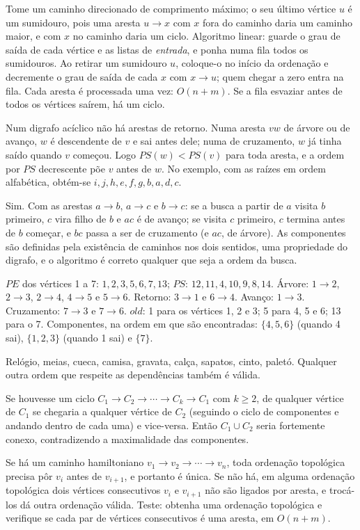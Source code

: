  Tome um caminho direcionado de comprimento máximo; o seu último vértice $u$ é um sumidouro, pois uma aresta $u\to x$ com $x$ fora do caminho daria um caminho maior, e com $x$ no caminho daria um ciclo. Algoritmo linear: guarde o grau de saída de cada vértice e as listas de \emph{entrada}, e ponha numa fila todos os sumidouros. Ao retirar um sumidouro $u$, coloque-o no início da ordenação e decremente o grau de saída de cada $x$ com $x\to u$; quem chegar a zero entra na fila. Cada aresta é processada uma vez: $O(n+m)$. Se a fila esvaziar antes de todos os vértices saírem, há um ciclo.

 Num digrafo acíclico não há arestas de retorno. Numa aresta $vw$ de árvore ou de avanço, $w$ é descendente de $v$ e sai antes dele; numa de cruzamento, $w$ já tinha saído quando $v$ começou. Logo $PS(w)<PS(v)$ para toda aresta, e a ordem por $PS$ decrescente põe $v$ antes de $w$. No exemplo, com as raízes em ordem alfabética, obtém-se $i,j,h,e,f,g,b,a,d,c$.

 Sim. Com as arestas $a\to b$, $a\to c$ e $b\to c$: se a busca a partir de $a$ visita $b$ primeiro, $c$ vira filho de $b$ e $ac$ é de avanço; se visita $c$ primeiro, $c$ termina antes de $b$ começar, e $bc$ passa a ser de cruzamento (e $ac$, de árvore). As componentes são definidas pela existência de caminhos nos dois sentidos, uma propriedade do digrafo, e o algoritmo é correto qualquer que seja a ordem da busca.

 $PE$ dos vértices 1 a 7: $1,2,3,5,6,7,13$; $PS$: $12,11,4,10,9,8,14$. Árvore: $1\to2$, $2\to3$, $2\to4$, $4\to5$ e $5\to6$. Retorno: $3\to1$ e $6\to4$. Avanço: $1\to3$. Cruzamento: $7\to3$ e $7\to6$. $old$: 1 para os vértices 1, 2 e 3; 5 para 4, 5 e 6; 13 para o 7. Componentes, na ordem em que são encontradas: $\{4,5,6\}$ (quando 4 sai), $\{1,2,3\}$ (quando 1 sai) e $\{7\}$.

 Relógio, meias, cueca, camisa, gravata, calça, sapatos, cinto, paletó. Qualquer outra ordem que respeite as dependências também é válida.

 Se houvesse um ciclo $C_1\to C_2\to\cdots\to C_k\to C_1$ com $k\ge2$, de qualquer vértice de $C_1$ se chegaria a qualquer vértice de $C_2$ (seguindo o ciclo de componentes e andando dentro de cada uma) e vice-versa. Então $C_1\cup C_2$ seria fortemente conexo, contradizendo a maximalidade das componentes.

 Se há um caminho hamiltoniano $v_1\to v_2\to\cdots\to v_n$, toda ordenação topológica precisa pôr $v_i$ antes de $v_{i+1}$, e portanto é única. Se não há, em alguma ordenação topológica dois vértices consecutivos $v_i$ e $v_{i+1}$ não são ligados por aresta, e trocá-los dá outra ordenação válida. Teste: obtenha uma ordenação topológica e verifique se cada par de vértices consecutivos é uma aresta, em $O(n+m)$.

